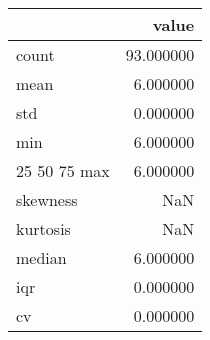 \begin{tabular}{lr}
\toprule
 & value \\
\midrule
count & 93.000000 \\
mean & 6.000000 \\
std & 0.000000 \\
min & 6.000000 \\
25%
50%
75%
max & 6.000000 \\
skewness & NaN \\
kurtosis & NaN \\
median & 6.000000 \\
iqr & 0.000000 \\
cv & 0.000000 \\
\bottomrule
\end{tabular}
